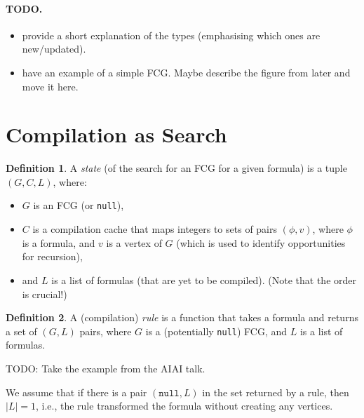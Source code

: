 \documentclass{article}
\theoremstyle{definition}
\newtheorem{definition}{Definition}
\theoremstyle{remark}
\begin{document}
\paragraph{TODO.}
\begin{itemize}
\item provide a short explanation of the types (emphasising which ones are new/updated). %
\item have an example of a simple FCG. Maybe describe the figure from later and move it here.
\end{itemize}

\section{Compilation as Search}

\begin{definition}
  A \emph{state} (of the search for an FCG for a given formula) is a tuple $(G, C, L)$, where:
  \begin{itemize}
  \item $G$ is an FCG (or \texttt{null}),
  \item $C$ is a compilation cache that maps integers to sets of pairs $(\phi, v)$, where $\phi$ is a formula, and $v$ is a vertex of $G$ (which is used to identify opportunities for recursion),
  \item and $L$ is a list of formulas (that are yet to be compiled). (Note that the order is crucial!)
  \end{itemize}
\end{definition}

\begin{definition}
  A (compilation) \emph{rule} is a function that takes a formula and returns a set of $(G, L)$ pairs, where $G$ is a (potentially \texttt{null}) FCG, and $L$ is a list of formulas.

  TODO: Take the example from the AIAI talk.
\end{definition}

We assume that if there is a pair $(\texttt{null}, L)$ in the set returned by a rule, then $|L| = 1$, i.e., the rule transformed the formula without creating any vertices.
\end{document}
